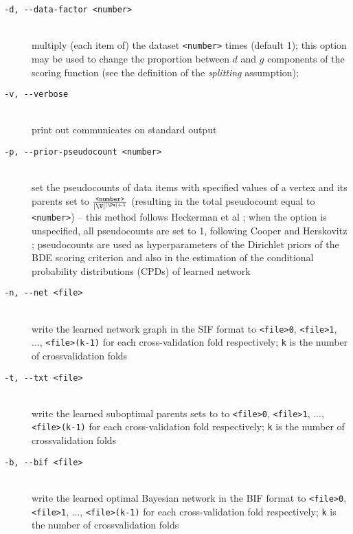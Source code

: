 \begin{description}
\item[\texttt{-d, -\hspace{0pt}-data-factor <number>}]~\\
 multiply (each item of) the dataset \texttt{<number>} times (default 1); 
 this option may be used to change the proportion between $d$ and $g$ components 
 of the scoring function (see the definition of the \emph{splitting} assumption);
\item[\texttt{-v, -\hspace{0pt}-verbose}]~\\
 print out communicates on standard output
\item[\texttt{-p, -\hspace{0pt}-prior-pseudocount <number>}]~\\
 set the pseudocounts of data items with specified values of a vertex and its parents set 
 to $\frac{\texttt{<number>}}{|\V|^{|\Pa|+1}}$ 
 (resulting in the total pseudocount equal to \texttt{<number>}) 
 -- this method follows Heckerman et al \cite{heckerman95}; 
 when the option is unspecified, all pseudocounts are set to 1, 
 following Cooper and Herskovitz \cite{cooper92}; 
 pseudocounts are used as hyperparameters of the Dirichlet priors 
 of the BDE scoring criterion and also in the estimation 
 of the conditional probability distributions (CPDs) of learned network
\item[\texttt{-n, -\hspace{0pt}-net <file>}]~\\
 write the learned network graph in the SIF format to \texttt{<file>0}, \texttt{<file>1}, ..., \texttt{<file>(k-1)}
 for each cross-validation fold respectively; \texttt{k} is the number of crossvalidation folds
\item[\texttt{-t, -\hspace{0pt}-txt <file>}]~\\
 write the learned suboptimal parents sets to to \texttt{<file>0}, \texttt{<file>1}, ..., \texttt{<file>(k-1)}
 for each cross-validation fold respectively; \texttt{k} is the number of crossvalidation folds
\item[\texttt{-b, -\hspace{0pt}-bif <file>}]~\\
 write the learned optimal Bayesian network in the BIF format to \texttt{<file>0}, \texttt{<file>1}, ..., \texttt{<file>(k-1)}
 for each cross-validation fold respectively; \texttt{k} is the number of crossvalidation folds

\end{description}
